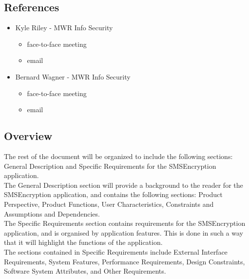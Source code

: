 \subsection{References}
\begin{itemize}
\item{Kyle Riley - MWR Info Security}
\begin{itemize}
\item face-to-face meeting
\item email
\end{itemize}

\item{Bernard Wagner - MWR Info Security}
\begin{itemize}
\item face-to-face meeting
\item email
\end{itemize}
\end{itemize}

\subsection{Overview}
The rest of the document will be organized to include the following sections: General Description and Specific Requirements for the SMSEncryption application.
\vspace{10pt}\\
The General Description section will provide a background to the reader for the SMSEncryption application, and contains the following sections: Product Perspective, Product Functions, User Characteristics, Constraints and Assumptions and Dependencies.
\vspace{10pt}\\
The Specific Requirements section contains requirements for the SMSEncryption application, and is organised by application features. This is done in such a way that it will highlight the functions of the application. 
\vspace{10pt}\\
The sections contained in Specific Requirements include External Interface Requirements, System Features, Performance Requirements, Design Constraints, Software System Attributes, and Other Requirements.
\vspace{10pt}


